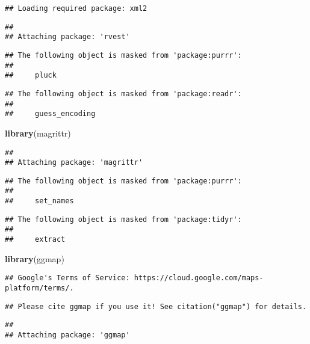 \documentclass[]{article}
\newenvironment{Shaded}{\begin{snugshade}}{\end{snugshade}}
\newcommand{\KeywordTok}[1]{\textcolor[rgb]{0.13,0.29,0.53}{\textbf{#1}}}
\newcommand{\NormalTok}[1]{#1}
\begin{document}
\begin{verbatim}
## Loading required package: xml2
\end{verbatim}

\begin{verbatim}
## 
## Attaching package: 'rvest'
\end{verbatim}

\begin{verbatim}
## The following object is masked from 'package:purrr':
## 
##     pluck
\end{verbatim}

\begin{verbatim}
## The following object is masked from 'package:readr':
## 
##     guess_encoding
\end{verbatim}

\begin{Shaded}
\begin{Highlighting}[]
\KeywordTok{library}\NormalTok{(magrittr)}
\end{Highlighting}
\end{Shaded}

\begin{verbatim}
## 
## Attaching package: 'magrittr'
\end{verbatim}

\begin{verbatim}
## The following object is masked from 'package:purrr':
## 
##     set_names
\end{verbatim}

\begin{verbatim}
## The following object is masked from 'package:tidyr':
## 
##     extract
\end{verbatim}

\begin{Shaded}
\begin{Highlighting}[]
\KeywordTok{library}\NormalTok{(ggmap)}
\end{Highlighting}
\end{Shaded}

\begin{verbatim}
## Google's Terms of Service: https://cloud.google.com/maps-platform/terms/.
\end{verbatim}

\begin{verbatim}
## Please cite ggmap if you use it! See citation("ggmap") for details.
\end{verbatim}

\begin{verbatim}
## 
## Attaching package: 'ggmap'
\end{verbatim}
\end{document}
